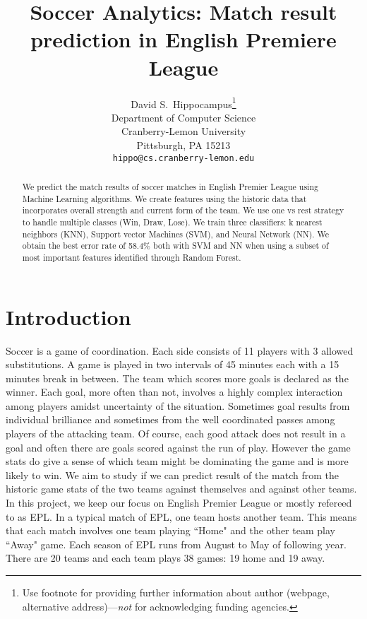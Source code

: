 \documentclass{article}
\title{Soccer Analytics: Match result prediction in English Premiere League}
\author{%
  David S.~Hippocampus\thanks{Use footnote for providing further information
    about author (webpage, alternative address)---\emph{not} for acknowledging
    funding agencies.} \\
  Department of Computer Science\\
  Cranberry-Lemon University\\
  Pittsburgh, PA 15213 \\
  \texttt{hippo@cs.cranberry-lemon.edu} \\
}
\begin{document}
\maketitle

\begin{abstract}
	We predict the match results of soccer matches in English Premier League using Machine Learning algorithms. We create features using the historic data that incorporates overall strength and current form of the team.  We use one vs rest strategy to handle multiple classes (Win, Draw, Lose). We train three classifiers: k nearest neighbors (KNN), Support vector Machines (SVM), and Neural Network (NN). We obtain the best error rate of 58.4\% both with SVM and NN when using a subset of most important features identified through Random Forest.
\end{abstract}

\section{Introduction}
Soccer is a game of coordination. Each side consists of 11 players with 3 allowed substitutions. A game is played in two intervals of 45 minutes each with a 15 minutes break in between. The team which scores more goals is declared as the winner. Each goal, more often than not, involves a highly complex interaction among players amidst uncertainty of the situation. Sometimes goal results from individual brilliance and sometimes from the well coordinated passes among players of the attacking team. Of course, each good attack does not result in a goal and often there are goals scored against the run of play. However the game stats do give a sense of which team might be dominating the game and is more likely to win. We aim to study if we can predict result of the match from the historic game stats of the two teams against themselves and against other teams.
In this project, we keep our focus on English Premier League or mostly refereed to as EPL. In a typical match of EPL, one team hosts another team. This means that each match involves one team playing ``Home" and the other team play ``Away" game. Each season of EPL runs from August to  May of following year. There are 20 teams and each team plays 38 games: 19 home and 19 away. 
\end{document}
